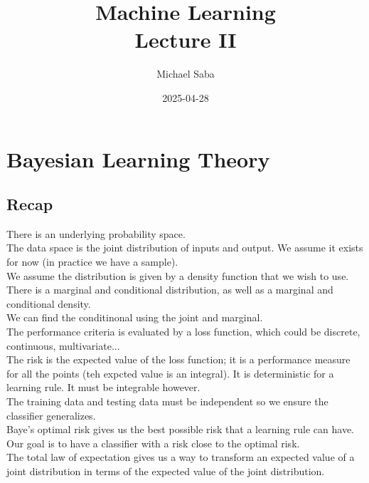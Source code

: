 \documentclass[12pt]{article}
\title{%
    \Huge Machine Learning \\
    \Large Lecture II
}
\date{2025-04-28}
\author{Michael Saba}
\begin{document}
\maketitle
\newpage
\setlength{\parindent}{0pt}

\section*{Bayesian Learning Theory}

\subsection*{Recap}

There is an underlying probability space. \\

The data space is the joint distribution of
inputs and output.
We assume it exists for now
(in practice we have a sample). \\

We assume the distribution is given by a density
function that we wish to use. \\

There is a marginal and conditional distribution,
as well as a marginal and conditional density. \\

We can find the conditinonal using the joint
and marginal. \\

The performance criteria is evaluated
by a loss function, which could be
discrete, continuous, multivariate... \\

The risk is the expected value of the loss
function; it is a performance measure for all
the points (teh expcted value is an integral).
It is deterministic for a learning rule.
It must be integrable however. \\

The training data and testing data must
be independent so we ensure the classifier
generalizes. \\

Baye's optimal risk gives us the best possible
risk that a learning rule can have.
Our goal is to have a classifier with a risk
close to the optimal risk. \\

The total law of expectation gives us a way
to transform an expected value of a joint
distribution in terms of the expected value
of the joint distribution. \\
\end{document}
